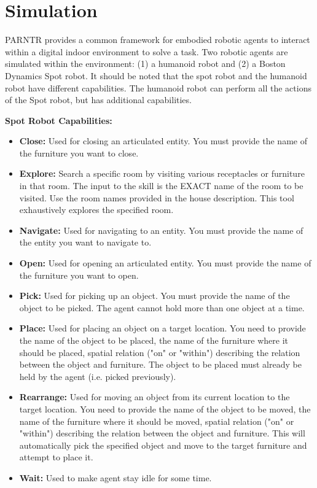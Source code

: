 \section{Simulation}



PARNTR provides a common framework for embodied robotic agents to interact within a digital indoor environment to solve a task.  Two robotic agents are simulated within the environment: (1) a humanoid robot and (2) a Boston Dynamics Spot robot.  It should be noted that the spot robot and the humanoid robot have different capabilities.  The humanoid robot can perform all the actions of the Spot robot, but has additional capabilities.

\textbf{Spot Robot Capabilities:}
\begin{itemize}
      \item \textbf{Close:}
            Used for closing an articulated entity. You must provide the name of the furniture you want to close.
      \item \textbf{Explore:}
            Search a specific room by visiting various receptacles or furniture in that room. The input to the skill is the EXACT name of the room to be visited. Use the room names provided in the house description. This tool exhaustively explores the specified room.
      \item \textbf{Navigate:}
            Used for navigating to an entity. You must provide the name of the entity you want to navigate to.
      \item \textbf{Open:}
            Used for opening an articulated entity. You must provide the name of the furniture you want to open.
      \item \textbf{Pick:}
            Used for picking up an object. You must provide the name of the object to be picked. The agent cannot hold more than one object at a time.
      \item \textbf{Place:}
            Used for placing an object on a target location. You need to provide the name of the object to be placed, the name of the furniture where it should be placed, spatial relation ("on" or "within") describing the relation between the object and furniture. The object to be placed must already be held by the agent (i.e. picked previously).
      \item \textbf{Rearrange:}
            Used for moving an object from its current location to the target location. You need to provide the name of the object to be moved, the name of the furniture where it should be moved, spatial relation ("on" or "within") describing the relation between the object and furniture. This will automatically pick the specified object and move to the target furniture and attempt to place it.
      \item \textbf{Wait:}
            Used to make agent stay idle for some time.
\end{itemize}



